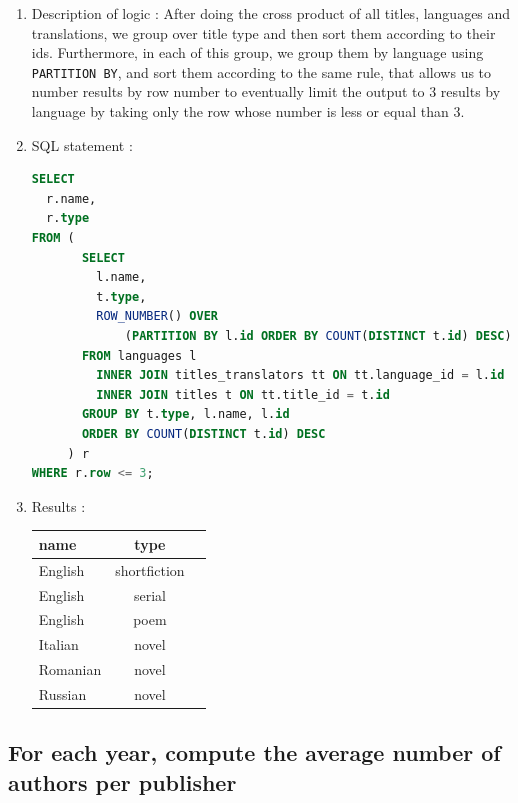 \documentclass[doubleside, titlepage]{article}
\begin{document}
	\begin{enumerate}
	\item Description of logic : After doing the cross product of all titles, languages and translations, we group over title type and then sort them according to their ids. Furthermore, in each of this group, we group them by language using \texttt{PARTITION BY}, and sort them according to the same rule, that allows us to number results by row number to eventually limit the output to 3 results by language by taking only the row whose number is less or equal than 3.
	\item SQL statement :
		\begin{lstlisting}[language=SQL,showspaces=false,basicstyle=\ttfamily,numberstyle=\tiny,commentstyle=\color{gray}]
SELECT
  r.name,
  r.type
FROM (
       SELECT
         l.name,
         t.type,
         ROW_NUMBER() OVER 
             (PARTITION BY l.id ORDER BY COUNT(DISTINCT t.id) DESC) as row
       FROM languages l
         INNER JOIN titles_translators tt ON tt.language_id = l.id
         INNER JOIN titles t ON tt.title_id = t.id
       GROUP BY t.type, l.name, l.id
       ORDER BY COUNT(DISTINCT t.id) DESC
     ) r
WHERE r.row <= 3;
		\end{lstlisting}

	\item Results :\\

	\begin{tabular}{|l|c|r|}
	  \hline
		name & type\\
	  \hline
		English	& shortfiction \\
		English	& serial \\
		English	& poem \\
		Italian	& novel \\
		Romanian & novel \\
		Russian	& novel \\
	  \hline
	\end{tabular}
\end{enumerate}

\subsection{For each year, compute the average number of authors per publisher}
\end{document}
